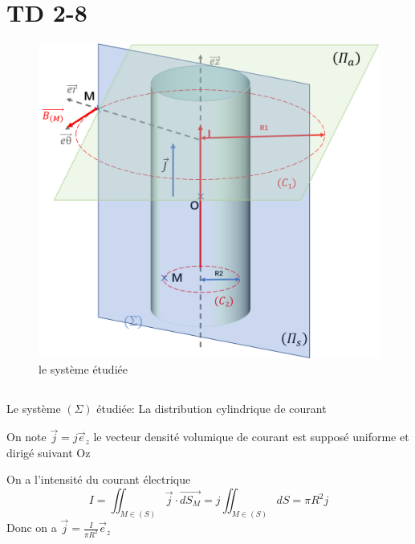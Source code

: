 \documentclass[a4paper,12pt]{book}
\begin{document}
\section{TD 2-8}
\begin{figure}[h]
    \begin{center}
    \includegraphics[scale=0.5]{elec22.png}
    \end{center}
    \caption{le système étudiée}
\end{figure}
\subsection{}
Le système $(\Sigma)$ étudiée: La distribution cylindrique de courant


On note $\vec{j}=j\vec{e}_z$ le vecteur densité volumique de courant est supposé uniforme et dirigé suivant Oz

On a l'intensité du courant électrique
$$
I=\iint_{M \in (S)}\vec{j}\cdot \overrightarrow{dS_M}=j\iint_{M \in (S)}dS=\pi R^2 j
$$
Donc on a $\vec{j}=\frac{I}{\pi R^2}\vec{e}_z$
\end{document}
